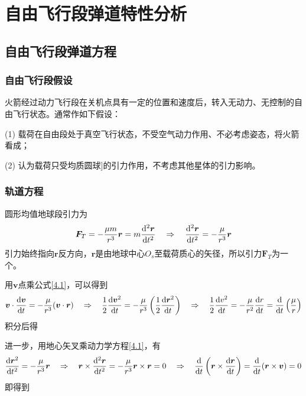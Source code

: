\chapter{自由飞行段弹道特性分析}
\thispagestyle{empty}
\section{自由飞行段弹道方程}
\subsection{自由飞行段假设}
火箭经过动力飞行段在关机点具有一定的位置和速度后，转入无动力、无控制的自由飞行状态。通常作如下假设：

 (1) 载荷在自由段处于真空飞行状态，不受空气动力作用、不必考虑姿态，将火箭看成\red[质点]；

 (2) 认为载荷只受\red[]均质圆球]的引力作用，不考虑其他星体的引力影响。

\subsection{轨道方程}
圆形均值地球段引力为
\begin{equation}
	\bm{F}_T = - \dfrac{\mu m}{r^3}\bm{r} = m \dfrac{{\rm{d}}^2 \bm{r}}{{\rm{d}} t^2} \quad \Rightarrow \quad \dfrac{{\rm{d}}^2 \bm{r}}{{\rm{d}} t^2} = - \dfrac{\mu}{r^3} \bm{r}
	\label{4.1}
\end{equation}
引力始终指向$\bm{r}$反方向，$\bm{r}$是由地球中心$O_s$至载荷质心的矢径，所以引力$\bm{F}_T$为一个。

用$\bm{v}$点乘公式\eqref{4.1}，可以得到
\begin{equation*}
	\bm{v} \cdot \dfrac{{\rm{d}} \bm{v}}{{\rm{d}} t} = - \dfrac{\mu}{r^3}(\bm{v} \cdot \bm{r}) \quad \Rightarrow \quad \dfrac{1}{2} \dfrac{{\rm{d}} \bm{v}^2}{{\rm{d}} t} = - \dfrac{\mu}{r^3}\left(\dfrac{1}{2}\dfrac{{\rm{d}} \bm{r}^2}{{\rm{d}} t}\right) \quad \Rightarrow \quad \dfrac{1}{2} \dfrac{{\rm{d}} v^2}{{\rm{d}} t} = -\dfrac{\mu}{r^2}\dfrac{{\rm{d}} r}{{\rm{d}} t} = \dfrac{{\rm{d}} }{{\rm{d}} t} \left(\dfrac{\mu}{r}\right)
\end{equation*}
积分后得


进一步，用地心矢叉乘动力学方程\eqref{4.1}，有
\begin{equation*}
	\dfrac{{\rm{d}} \bm{r}^2}{{\rm{d}} t^2} = - \dfrac{\mu}{r^3}\bm{r} \quad \Rightarrow \quad \bm{r} \times \dfrac{{\rm{d}}^2 \bm{r}}{{\rm{d}} t^2} = - \dfrac{\mu}{r^3} \bm{r} \times \bm{r} = 0 \quad \Rightarrow \quad \dfrac{{\rm{d}} }{{\rm{d}} t}\left(\bm{r} \times \dfrac{{\rm{d}} \bm{r}}{{\rm{d}} t}\right) = \dfrac{{\rm{d}} }{{\rm{d}} t}(\bm{r} \times \bm{v}) = 0
\end{equation*}
即得到

